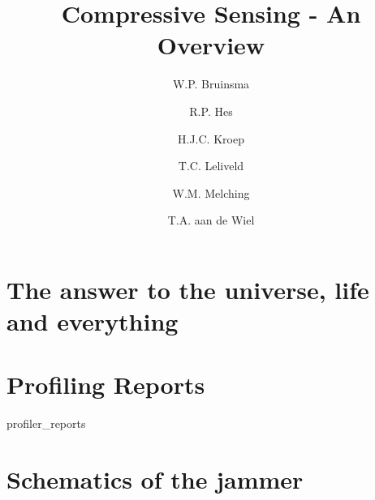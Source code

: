 \documentclass[a4paper, openany, oneside]{memoir}
\title{Compressive Sensing - An Overview}
\author{W.P. Bruinsma \and R.P. Hes \and H.J.C. Kroep \and T.C. Leliveld \and W.M. Melching \and T.A. aan de Wiel}
\begin{document}
\appendix

\chapter{The answer to the universe, life and everything}

\chapter{Profiling Reports}
\label{ap:prof}
{profiler_reports}

\chapter{Schematics of the jammer}

\end{document}
